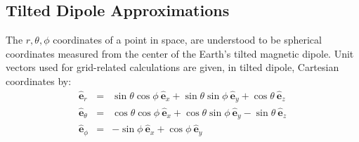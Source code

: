 \documentclass[11pt,letterpaper]{article}
\begin{document}
\subsection{Tilted Dipole Approximations}

The $r,\theta,\phi$ coordinates of a point in space, are understood to be spherical coordinates measured from the center of the Earth's tilted magnetic dipole.  Unit vectors used for grid-related calculations are given, in tilted dipole, Cartesian coordinates by:  
\begin{eqnarray}
\hat{\mathbf{e}}_r &=& \sin \theta \cos \phi ~ \hat{\mathbf{e}}_x + \sin \theta \sin \phi ~ \hat{\mathbf{e}}_y + \cos \theta ~ \hat{\mathbf{e}}_z \\
\hat{\mathbf{e}}_\theta &=& \cos \theta \cos \phi ~ \hat{\mathbf{e}}_x + \cos \theta \sin \phi ~ \hat{\mathbf{e}}_y - \sin \theta ~ \hat{\mathbf{e}}_z \\
\hat{\mathbf{e}}_\phi &=& -\sin \phi ~ \hat{\mathbf{e}}_x + \cos \phi ~ \hat{\mathbf{e}}_y
\end{eqnarray}

\end{document}
